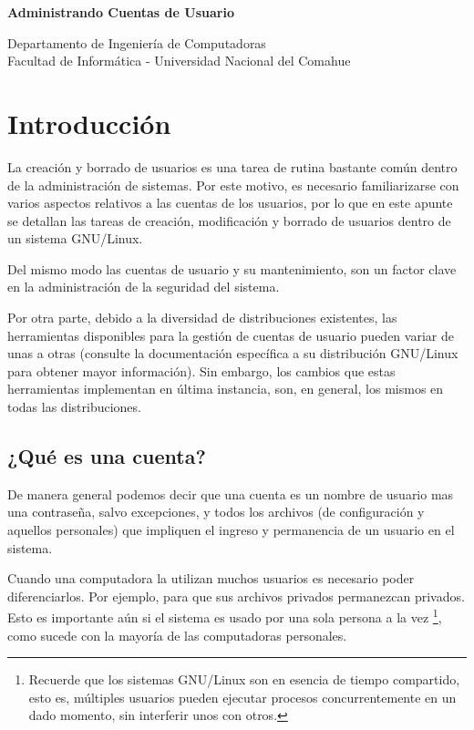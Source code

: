 \documentclass[12pt]{article}
\def\maketitle{

 \makeatletter
 {\color{bl} \centering \huge \sc \textbf{
Administrando Cuentas de Usuario \\
 \vspace*{8pt} }\par}
 \makeatother


 \makeatletter
 {\centering \small 
 	Departamento de Ingeniería de Computadoras \\
 	Facultad de Informática - Universidad Nacional del Comahue \\
 	\vspace{20pt} }
 \makeatother

}
\begin{document}
\thispagestyle{empty}
\maketitle
\setlength{\parindent}{0pt}




\section*{Introducción}
La creación y borrado de usuarios es una tarea de rutina bastante 
común dentro de la administración de sistemas. Por este motivo, 
es necesario familiarizarse con varios aspectos relativos a las
cuentas de los usuarios, por lo que en este apunte se detallan 
las tareas de creación, modificación y borrado de usuarios dentro 
de un sistema GNU/Linux.

Del mismo modo las cuentas de usuario y su mantenimiento, son un 
factor clave en la administración de la seguridad del sistema.

Por otra parte, debido a la diversidad de distribuciones existentes,
las herramientas disponibles para la gestión de cuentas de usuario pueden 
variar de unas a otras (consulte la documentación
específica a su distribución GNU/Linux para obtener mayor información). Sin 
embargo, los cambios que estas herramientas implementan  en última instancia, 
son, en general, los mismos en todas las distribuciones.  

\subsection*{¿Qué es una cuenta?}
De manera general podemos decir que una cuenta es un nombre de usuario 
mas una contraseña, salvo excepciones, y todos los archivos 
(de configuración y aquellos personales) que
impliquen el ingreso y permanencia de un usuario en el sistema.

Cuando una computadora la utilizan muchos usuarios es necesario poder
diferenciarlos. Por ejemplo, para que sus archivos privados
permanezcan privados. Esto es importante aún si el sistema es usado por una
sola persona a la vez \footnote{Recuerde que los sistemas GNU/Linux son 
en esencia de tiempo compartido, esto es, múltiples usuarios pueden ejecutar
procesos concurrentemente en un dado momento, sin interferir unos con otros.},
como sucede con la mayoría de las computadoras personales.
\end{document}
